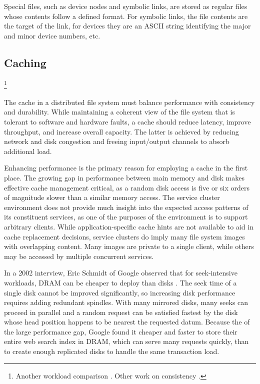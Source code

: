 Special files, such as device nodes and symbolic links, are stored as regular files whose contents follow a defined format. For symbolic links, the file contents are the target of the link, for devices they are an ASCII string identifying the major and minor device numbers, etc.

\subsection{Caching}%
%
\footnote{Another workload comparison \cite{roselli}. Other work on consistency \cite{triantafillou,vilayannur}.}

The cache in a distributed file system must balance performance with consistency and durability. While maintaining a coherent view of the file system that is tolerant to software and hardware faults, a cache should reduce latency, improve throughput, and increase overall capacity. The latter is achieved by reducing network and disk congestion and freeing input/output channels to absorb additional load.

Enhancing performance is the primary reason for employing a cache in the first place. The growing gap in performance between main memory and disk makes effective cache management critical, as a random disk access is five or six orders of magnitude slower than a similar memory access. The service cluster environment does not provide much insight into the expected access patterns of its constituent services, as one of the purposes of the environment is to support arbitrary clients. While application-specific cache hints are not available to aid in cache replacement decisions, service clusters do imply many file system images with overlapping content. Many images are private to a single client, while others may be accessed by multiple concurrent services.

In a 2002 interview, Eric Schmidt of Google observed that for seek-intensive workloads, DRAM can be cheaper to deploy than disks \cite{spring}. The seek time of a single disk cannot be improved significantly, so increasing disk performance requires adding redundant spindles. With many mirrored disks, many seeks can proceed in parallel and a random request can be satisfied fastest by the disk whose head position happens to be nearest the requested datum. Because the of the large performance gap, Google found it cheaper and faster to store their entire web search index in DRAM, which can serve many requests quickly, than to create enough replicated disks to handle the same transaction load.

